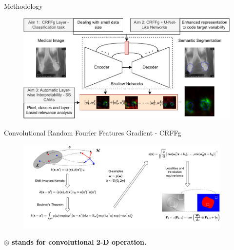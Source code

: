 \documentclass[aspectratio=169]{beamer}
\begin{document}
\begin{frame}{Methodology}

\begin{figure}
    \centering \includegraphics[width=0.8\linewidth]{Figures/contribution_thesis.pdf}
\end{figure}

\end{frame}




\begin{frame}{Convolutional Random Fourier Features Gradient - CRFFg}
    \begin{figure}
        \centering \includegraphics[trim={1.1cm 0 0 0},clip, width=0.95\textwidth]{Figures/CRFFg.pdf}
    \end{figure}
\vspace{-0.6cm}
\hfill \textbf{\footnotesize{$\otimes$ stands for convolutional 2-D operation.}}
\end{frame}
\end{document}
